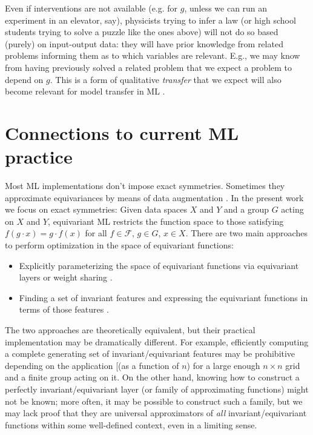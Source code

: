 \documentclass{article}
\theoremstyle{plain}
\theoremstyle{definition}
\theoremstyle{remark}
\begin{document}
Even if interventions are not available (e.g. for $g$, unless we can run an experiment in an elevator, say), physicists trying to infer a law (or high school students trying to solve a puzzle like the ones above) will not do so based (purely) on input-output data: they will have prior knowledge from related problems informing them as to which variables are relevant. E.g., we may know from having previously solved a related problem that we expect a problem to depend on $g$.
This is a form of qualitative {\em transfer} that we expect will also become relevant for model transfer in ML \cite{RojSchTurPet18}.

\section{Connections to current ML practice}\label{sec:practice}

Most ML implementations don't impose exact symmetries. Sometimes they approximate equivariances by means of data augmentation \cite{chen2020group}.
In the present work we focus on exact symmetries: Given data spaces $X$ and $Y$ and a group $G$ acting on $X$ and $Y$, equivariant ML restricts the function space to those satisfying  $f(g\cdot x) = g \cdot f(x)$ for all $f\in \mathcal F$, $g\in G$, $x\in X$.
There are two main approaches to perform optimization in the space of equivariant functions:
\vspace{-2ex}\begin{itemize}
\parskip
\topsep 0pt
\partopsep 0pt
\parskip 0pt
    \item Explicitly parameterizing the space of equivariant functions via equivariant layers or weight sharing \cite{cohen2016group, kondor2018convolution, thomas2018tensor, geiger2022e3nn, finzi2020generalizing, finzi2021practical}.
    \item Finding a set of invariant features and expressing the equivariant functions in terms of those features \cite{villar2021scalars,blum2022equivariant}.
\end{itemize}\vspace{-2ex}
The two approaches are theoretically equivalent, but their practical implementation may be dramatically different. For example, efficiently computing a complete generating set of invariant/equivariant features may be prohibitive depending on the application [(as a function of $n$) for a large enough $n\times n$ grid  and a finite group acting on it. On the other hand, knowing how to construct a perfectly invariant/equivariant layer (or family of approximating functions) might not be known; more often, it may be possible to construct such a family, but we may lack proof that they are universal approximators of \textit{all} invariant/equivariant functions within some well-defined context, even in a limiting sense.
\end{document}
